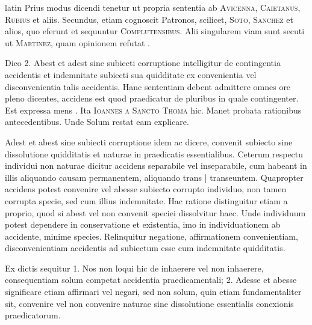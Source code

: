 \begin{otherlanguage*}{latin}
\pstart
  Prius modus dicendi tenetur ut propria sententia ab \textsc{Avicenna}, \textsc{Caietanus}, \textsc{Rubius} et aliis. Secundus, etiam cognoscit Patronos, scilicet, \textsc{Soto}, \textsc{Sanchez} et alios, quo eferunt et sequuntur \textsc{Complutensibus}\index[persons]{}. Alii singularem viam sunt secuti ut \textsc{Martinez}, quam opinionem refutat . 
\pend

\pstart
  Dico 2. Abest et adest sine subiecti corruptione intelligitur de contingentia accidentis et indemnitate subiecti sua quidditate ex convenientia vel disconvenientia talis accidentis. Hanc sententiam debent admittere omnes ore pleno dicentes, accidens est quod praedicatur de pluribus in quale contingenter. Est expressa mens . Ita \textsc{Ioannes a Sancto Thoma} hic. Manet probata rationibus antecedentibus. Unde Solum restat eam explicare. 
\pend

\pstart
   Adest et abest sine subiecti corruptione idem ac dicere, convenit subiecto sine dissolutione quidditatis et naturae in praedicatis essentialibus. Ceterum respectu individui non naturae dicitur accidens separabile vel inseparabile, cum habeant in illis aliquando causam permanentem, aliquando trans \textnormal{|}    transeuntem. Quapropter accidens potest convenire vel abesse subiecto corrupto individuo, non tamen corrupta specie, sed cum illius indemnitate. Hac ratione distinguitur etiam a proprio, quod si abest vel non convenit speciei dissolvitur haec. Unde individuum potest dependere in conservatione et existentia, imo in individuationem ab accidente, minime species. Relinquitur negatione, affirmationem convenientiam, disconvenientiam accidentis ad subiectum esse cum indemnitate quidditatis. 
\pend

\pstart
  Ex dictis sequitur 1. Nos non loqui hic de inhaerere vel non inhaerere, consequentiam solum competat accidentia praedicamentali; 2. Adesse et abesse significare etiam affirmari vel negari, sed non solum, quin etiam fundamentaliter sit, convenire vel non convenire naturae sine dissolutione essentialis conexionis praedicatorum. 
\pend


\end{otherlanguage*}
